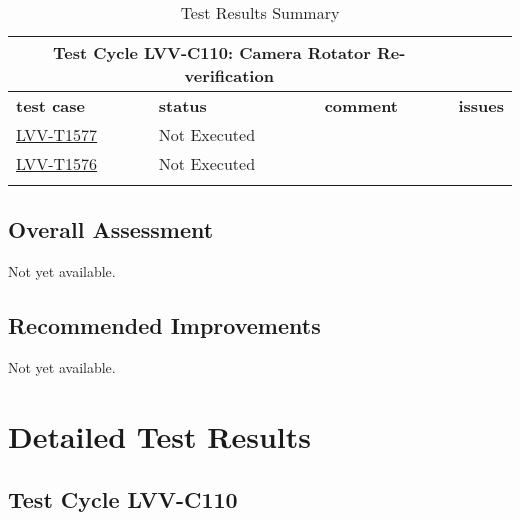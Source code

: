 \documentclass[SE,lsstdraft,STR,toc]{lsstdoc}
\begin{document}
\begin{longtable}{p{}p{}p{}p{}}
\toprule

  \multicolumn{3}{c}{ Test Cycle {\bf LVV-C110: Camera Rotator Re-verification
 }} \\\hline

  {\bf \footnotesize test case} & {\bf \footnotesize status} & {\bf \footnotesize comment} & {\bf \footnotesize issues} \\\toprule

    \href{https://jira.lsstcorp.org/secure/Tests.jspa#/testCase/LVV-T1577}{LVV-T1577}
    & Not Executed &
    \begin{minipage}[]{0.56\textwidth}
    \smallskip
    
    \medskip
    \end{minipage}
    &     \\\hline
    \href{https://jira.lsstcorp.org/secure/Tests.jspa#/testCase/LVV-T1576}{LVV-T1576}
    & Not Executed &
    \begin{minipage}[]{0.56\textwidth}
    \smallskip
    
    \medskip
    \end{minipage}
    &     \\\hline

\caption{Test Results Summary}
\label{table:summary}
\end{longtable}

\subsection{Overall Assessment}
\label{sect:overallassessment}

Not yet available.

\subsection{Recommended Improvements}
\label{sect:recommendations}

Not yet available.

\newpage
\section{Detailed Test Results}
\label{sect:detailedtestresults}


  \subsection{Test Cycle LVV-C110 }
\end{document}
